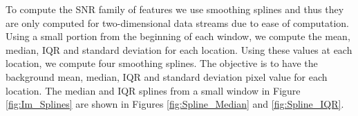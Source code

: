 \documentclass[11pt]{article}
\begin{document}
	 To compute the SNR family of features  we use smoothing splines and thus they are only computed for two-dimensional data streams due to ease of computation. Using a small portion from the beginning of each window, we compute the mean, median, IQR and standard deviation for each location. Using these values at each location, we compute four smoothing splines. The objective is to have the background mean, median, IQR and standard deviation pixel value for each location.  The median and IQR splines from a small window in Figure \ref{fig:Im_Splines} are shown in Figures \ref{fig:Spline_Median} and \ref{fig:Spline_IQR}. %
	 
	\begin{figure}[H]
		 	\centering
\end{figure}
\end{document}

